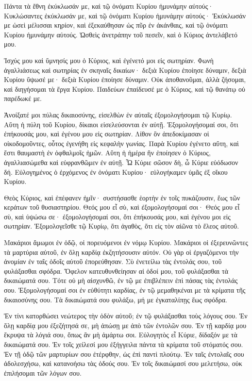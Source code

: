 \begin{spacing}{1.1}
\begin{multicols}{2}
Πάντα τὰ ἔθνη ἐκύκλωσάν με, καὶ τῷ ὀνόματι Κυρίου ἠμυνάμην αὐτούς·
Κυκλώσαντες ἐκύκλωσάν με, καὶ τῷ ὀνόματι Κυρίου ἠμυνάμην αὐτούς·
Ἐκύκλωσάν με ὡσεὶ μέλισσαι κηρίον, καὶ ἐξεκαύθησαν ὡς πῦρ ἐν ἀκάνθαις, καὶ τῷ ὀνόματι Κυρίου ἠμυνάμην αὐτούς.
Ὠσθεὶς ἀνετράπην τοῦ πεσεῖν, καὶ ὁ Κύριος ἀντελάβετό μου.

Ἰσχύς μου καὶ ὕμνησίς μου ὁ Κύριος, καὶ ἐγένετό μοι εἰς σωτηρίαν.
Φωνὴ ἀγαλλιάσεως καὶ σωτηρίας ἐν σκηναῖς δικαίων· δεξιὰ Κυρίου ἐποίησε δύναμιν,
δεξιὰ Κυρίου ὕψωσέ με· δεξιὰ Κυρίου ἐποίησε δύναμιν.
Οὐκ ἀποθανοῦμαι, ἀλλὰ ζήσομαι, καὶ διηγήσομαι τὰ ἔργα Κυρίου.
Παιδεύων ἐπαίδευσέ με ὁ Κύριος, καὶ τῷ θανάτῳ οὐ παρέδωκέ με.

Ἀνοίξατέ μοι πύλας δικαιοσύνης, εἰσελθὼν ἐν αὐταῖς ἐξομολογήσομαι τῷ Κυρίῳ.
Αὕτη ἡ πύλη τοῦ Κυρίου, δίκαιοι εἰσελεύσονται ἐν αὐτῇ.
Ἐξομολογήσομαί σοι, ὅτι ἐπήκουσάς μου, καὶ ἐγένου μου εἰς σωτηρίαν.
Λίθον ὃν ἀπεδοκίμασαν οἱ οἰκοδομοῦντες, οὗτος ἐγενήθη εἰς κεφαλὴν γωνίας.
Παρὰ Κυρίου ἐγένετο αὕτη, καὶ ἔστι θαυμαστὴ ἐν ὀφθαλμοῖς ἡμῶν.
Αὕτη ἡ ἡμέρα ἣν ἐποίησεν ὁ Κύριος, ἀγαλλιασώμεθα καὶ εὐφρανθῶμεν ἐν αὐτῇ.
Ὦ Κύριε σῶσον δὴ, ὦ Κύριε εὐόδωσον δή.
Εὐλογημένος ὁ ἐρχόμενος ἐν ὀνόματι Κυρίου· εὐλογήκαμεν ὑμᾶς ἐξ οἴκου Κυρίου.

Θεὸς Κύριος, καὶ ἐπέφανεν ἡμῖν· συστήσασθε ἑορτὴν ἐν τοῖς πυκάζουσιν, ἕως τῶν κεράτων τοῦ θυσιαστηρίου.
Θεός μου εἶ σὺ, καὶ ἐξομολογήσομαί σοι· Θεός μου εἶ σὺ, καὶ ὑψώσω σε· ἐξομολογήσομαί σοι, ὅτι ἐπήκουσάς μου, καὶ ἐγένου μοι εἰς σωτηρίαν.
Ἐξομολογεῖσθε τῷ Κυρίῳ, ὅτι ἀγαθὸς, ὅτι εἰς τὸν αἰῶνα τὸ ἔλεος αὐτοῦ.

Μακάριοι ἄμωμοι ἐν ὁδῷ, οἱ πορευόμενοι ἐν νόμῳ Κυρίου.
Μακάριοι οἱ ἐξερευνῶντες τὰ μαρτύρια αὐτοῦ, ἐν ὅλῃ καρδίᾳ ἐκζητήσουσιν αὐτόν.
Οὐ γὰρ οἱ ἐργαζόμενοι τὴν ἀνομίαν ἐν ταῖς ὁδοῖς αὐτοῦ ἐπορεύθησαν.
Σὺ ἐνετείλω τὰς ἐντολάς σου, τοῦ φυλάξασθαι σφόδρα.
Ὄφελον κατευθυνθείησαν αἱ ὁδοί μου, τοῦ φυλάξασθαι τὰ δικαιώματά σου.
Τότε οὐ μὴ αἰσχυνθῶ, ἐν τῷ με ἐπιβλέπειν ἐπὶ πάσας τὰς ἐντολάς σου.
Ἐξομολογήσομαί σοι ἐν εὐθύτητι καρδίας, ἐν τῷ μεμαθηκέναι με τὰ κρίματα τῆς δικαιοσύνης σου.
Τὰ δικαιώματά σου φυλάξω, μή με ἐγκαταλίπῃς ἕως σφόδρα.

Ἐν τίνι κατορθώσει νεώτερος τὴν ὁδὸν αὐτοῦ; ἐν τῷ φυλάξασθαι τοὺς λόγους σου.
Ἐν ὅλῃ καρδίᾳ μου ἐξεζήτησά σε, μὴ ἀπώσῃ με ἀπὸ τῶν ἐντολῶν σου.
Ἐν τῇ καρδίᾳ μου ἔκρυψα τὰ λόγιά σου, ὅπως ἂν μὴ ἁμάρτω σοι.
Εὐλογητὸς εἶ Κύριε, δίδαξόν με τὰ δικαιώματά σου.
Ἐν τοῖς χείλεσί μου ἐξήγγειλα πάντα τὰ κρίματα τοῦ στόματός σου.
Ἐν τῇ ὁδῷ τῶν μαρτυρίων σου ἐτέρφθην, ὡς ἐπὶ παντὶ πλούτῳ.
Ἐν ταῖς ἐντολαῖς σου ἀδολεσχήσω, καὶ κατανοήσω τὰς ὁδούς σου.
Ἐν τοῖς δικαιώμασί σου μελετήσω, οὐκ ἐπιλήσομαι τῶν λόγων σου.


\end{multicols}
\end{spacing}
